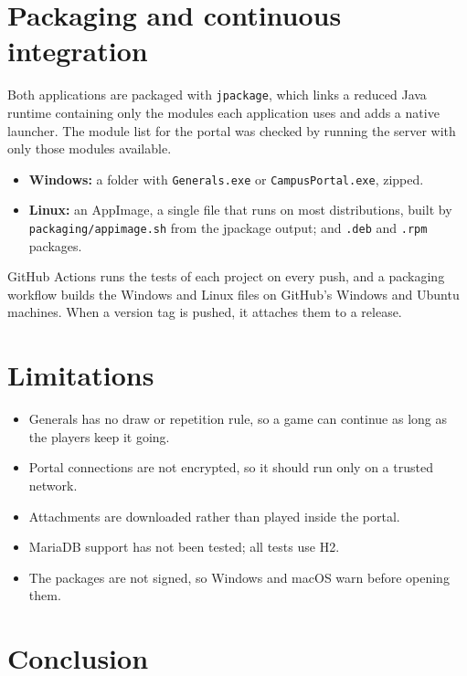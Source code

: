 \documentclass[11pt,a4paper]{article}
\begin{document}
\section{Packaging and continuous integration}

Both applications are packaged with \texttt{jpackage}, which links a reduced Java runtime containing only the modules each application uses and adds a native launcher. The module list for the portal was checked by running the server with only those modules available.

\begin{itemize}
\item \textbf{Windows:} a folder with \texttt{Generals.exe} or \texttt{CampusPortal.exe}, zipped.
\item \textbf{Linux:} an AppImage, a single file that runs on most distributions, built by \texttt{packaging/appimage.sh} from the jpackage output; and \texttt{.deb} and \texttt{.rpm} packages.
\end{itemize}

GitHub Actions runs the tests of each project on every push, and a packaging workflow builds the Windows and Linux files on GitHub's Windows and Ubuntu machines. When a version tag is pushed, it attaches them to a release.

\section{Limitations}

\begin{itemize}
\item Generals has no draw or repetition rule, so a game can continue as long as the players keep it going.
\item Portal connections are not encrypted, so it should run only on a trusted network.
\item Attachments are downloaded rather than played inside the portal.
\item MariaDB support has not been tested; all tests use H2.
\item The packages are not signed, so Windows and macOS warn before opening them.
\end{itemize}

\section{Conclusion}
\end{document}
